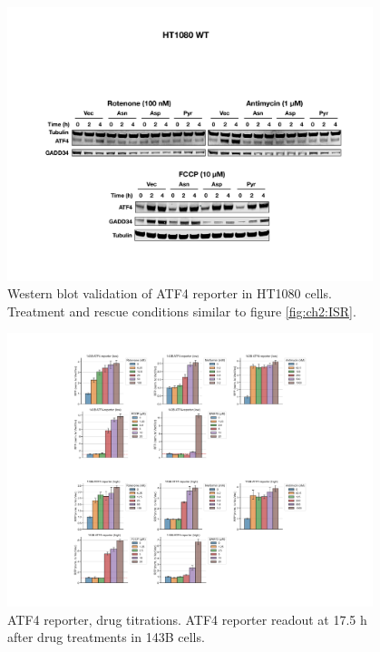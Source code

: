 \begin{figure}[ht]
    \centering
    \includegraphics[width=0.95\textwidth]{figures/chap2/app/HT1080_ISR_western.pdf}
    \caption[Mito inhibitor, ATF4 western.]{
    Western blot validation of ATF4 reporter in HT1080 cells.
    Treatment and rescue conditions similar to figure \ref{fig:ch2:ISR}.
    }
    \label{fig:app_ch2:HT1080_ISR_western}
\end{figure}

\begin{figure}[ht]
    \centering
    \includegraphics[width=0.95\textwidth]{figures/chap2/app/atf4_ETCtit.pdf}
    \caption[ATF4 reporter, drug titrations.]{
    ATF4 reporter, drug titrations.
    ATF4 reporter readout at 17.5 h after drug treatments in 143B cells.
    }
    \label{fig:app_ch2:atf4_ETCtit}
\end{figure}

